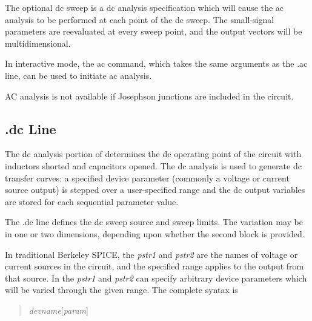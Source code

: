The optional dc sweep is a dc analysis specification which will cause
the ac analysis to be performed at each point of the dc sweep.  The
small-signal parameters are reevaluated at every sweep point, and the
output vectors will be multidimensional.

In interactive mode, the {\cb ac} command, which takes the same
arguments as the {\vt .ac} line, can be used to initiate ac analysis.

AC analysis is not available if Josephson junctions are included in the
circuit.

\subsection{{\vt .dc} Line}
\label{dcline}


The dc analysis portion of {\WRspice} determines the dc operating
point of the circuit with inductors shorted and capacitors opened. 
The dc analysis is used to generate dc transfer curves:  a specified
device parameter (commonly a voltage or current source output) is
stepped over a user-specified range and the dc output variables are
stored for each sequential parameter value.


The {\vt .dc} line defines the dc sweep source and sweep limits.  The
variation may be in one or two dimensions, depending upon whether the
second block is provided.

In traditional Berkeley SPICE, the {\it pstr1} and {\it pstr2} are the
names of voltage or current sources in the circuit, and the specified
range applies to the output from that source.  In {\WRspice} the {\it
pstr1} and {\it pstr2} can specify arbitrary device parameters which
will be varied through the given range.  The complete syntax is

\begin{quote}
{\it devname\/}{\vt [}{\it param\/}{\vt ]}
\end{quote}

